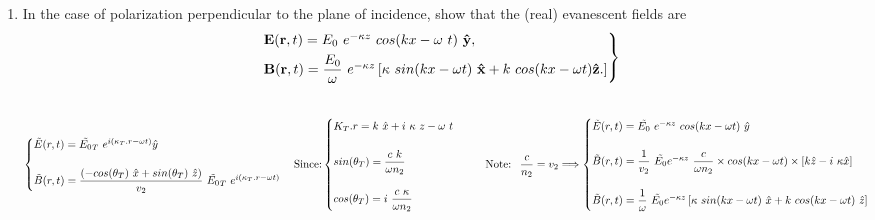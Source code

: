 \documentclass[fleqn]{article}
\begin{document}
\begin{enumerate}
\begin{enumerate}
      \item In the case of polarization perpendicular to the plane of incidence, show that
      the (real) evanescent fields are
      $$
        \begin{rcases*}
          \mathbf{E(r},t)=E_0 ~ e^{-\kappa z} ~ cos(kx-\omega ~ t) ~ \mathbf{\hat{y}},
          \\
          \mathbf{B(r},t)=\dfrac{E_0}{\omega} ~ e^{-\kappa z} \left[
            \kappa ~ sin(kx-\omega t) ~ \mathbf{\hat{x}}+k ~ cos(kx-\omega t) \mathbf{\hat{z}}.
          \right]
        \end{rcases*}
      $$

        \textcolor{hwColor}{
          \\
          $
            \begin{cases}
              \tilde{E}(r,t)=\tilde{E_0}_T ~ e^{i(\kappa_T.r-\omega t)} \hat{y}
              \\
              \\
              \tilde{B}(r,t)=\dfrac{\left(-cos(\theta_T) ~ \hat{x}+sin(\theta_T) ~ \hat{z}\right)}{v_2} ~ \tilde{E_0}_T ~ e^{i(\kappa_T.r-\omega t)} 
            \end{cases}
            \\
            \\
            \\
            \text{Since:}
            \\
            \\
            \begin{cases}
              K_T.r=k ~ \hat{x}+i ~ \kappa ~ z-\omega ~ t 
              \\
              \\
              sin(\theta_T)=\dfrac{c ~ k}{\omega n_2}
              \\
              \\
              cos(\theta_T)=i ~ \dfrac{c ~ \kappa}{\omega n_2}
            \end{cases} ~~~~~ \text{Note: ~} \dfrac{c}{n_2}=v_2
            \\
            \\
            \\
            \Longrightarrow
            \begin{cases}
              \tilde{E}(r,t)=\tilde{E_0} ~ e^{-\kappa z} ~ cos(kx-\omega t) ~ \hat{y}
              \\
              \\
              \tilde{B}(r,t)=\dfrac{1}{v_2} ~ \tilde{E_0} e^{-\kappa z} ~ \dfrac{c}{\omega n_2} \times cos(kx-\omega t) \times \left[k \hat{z}-i ~ \kappa \hat{x}\right]
              \\
              \\
              \tilde{B}(r,t)=\dfrac{1}{\omega} ~ \tilde{E_0} e^{-\kappa z} \left[
                \kappa ~ sin(kx-\omega t) ~ \hat{x}+k ~ cos(kx-\omega t) ~ \hat{z}
              \right] 
            \end{cases}
            \\
            \\
          $
        }


\end{enumerate}
\end{enumerate}
\end{document}
